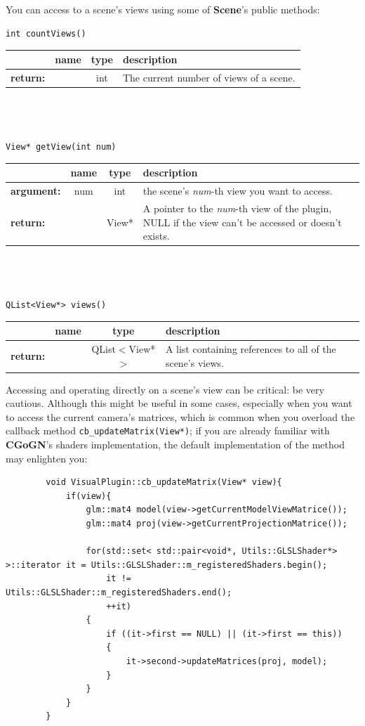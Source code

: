 \documentclass[a4paper]{scrreprt}
\begin{document}
	\paragraph{}
	You can access to a scene's views using some of \textbf{Scene}'s public
	methods:
	\begin{center}
		\texttt{int countViews()} \\
	\begin{tabular}{|l|c|c|p{}|}
		\hline
		~ & name & type & description
		\\ \hline
		\textbf{return:} & ~ & int &
			The current number of views of a scene.
		\\ \hline
	\end{tabular}
	\\~\\~\\
		\texttt{View* getView(int num)} \\
	\begin{tabular}{|l|c|c|p{}|}
		\hline
		~ & name & type & description
		\\ \hline
		\textbf{argument:} & num & int &
			the scene's \textit{num}-th view you want to access.
		\\ \hline
		\textbf{return:} & ~ & View* &
			A pointer to the \textit{num}-th view of the plugin, NULL if the view can't
			be accessed or doesn't exists.
		\\ \hline
	\end{tabular}
	\\~\\~\\
		\texttt{QList<View*> views()}
	\begin{tabular}{|l|c|c|p{}|}
		\hline
		~ & name & type & description
		\\ \hline
		\textbf{return:} & ~ & QList$<$View*$>$ &
			A list containing references to all of the scene's views.
		\\ \hline
	\end{tabular}
	\end{center}
	Accessing and operating directly on a scene's view can be critical: be very
	cautious. Although this might be useful in some cases, especially when you
	want to access the current camera's matrices, which is common when you overload
	the callback method \texttt{cb\_updateMatrix(View*)}; if you are already
	familiar with \textbf{CGoGN}'s shaders implementation, the default implementation of the
	method may enlighten you:
	\begin{lstlisting}
		void VisualPlugin::cb_updateMatrix(View* view){
			if(view){
				glm::mat4 model(view->getCurrentModelViewMatrice());
				glm::mat4 proj(view->getCurrentProjectionMatrice());
		
				for(std::set< std::pair<void*, Utils::GLSLShader*> >::iterator it = Utils::GLSLShader::m_registeredShaders.begin();
					it != Utils::GLSLShader::m_registeredShaders.end();
					++it)
				{
					if ((it->first == NULL) || (it->first == this))
					{
						it->second->updateMatrices(proj, model);
					}
				}
			}
		}
	\end{lstlisting}
	
\end{document}
